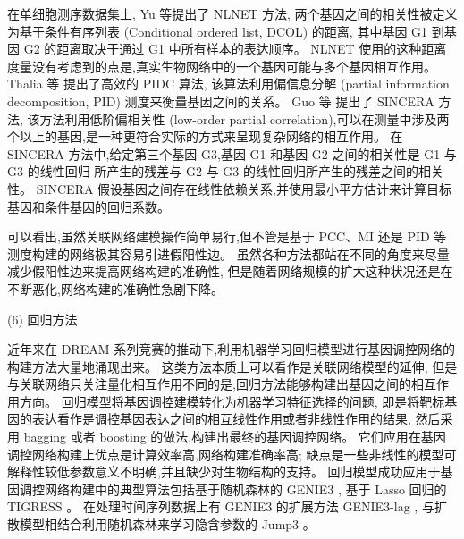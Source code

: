 在单细胞测序数据集上,
Yu 等提出了 NLNET 方法\cite{yu2013hierarchical}, 
两个基因之间的相关性被定义为基于条件有序列表 (Conditional ordered list, DCOL) 的距离,
其中基因 G1 到基因 G2 的距离取决于通过 G1 中所有样本的表达顺序。
NLNET 使用的这种距离度量没有考虑到的点是,真实生物网络中的一个基因可能与多个基因相互作用。
Thalia 等 \cite{chan2017gene} 提出了高效的 PIDC 算法,
该算法利用偏信息分解 (partial information decomposition, PID) 测度来衡量基因之间的关系。
Guo 等 \cite{guo2015sincera} 提出了 SINCERA 方法, 该方法利用低阶偏相关性 (low-order partial correlation),可以在测量中涉及两个以上的基因,是一种更符合实际的方式来呈现复杂网络的相互作用。
在 SINCERA 方法中,给定第三个基因 G3,基因 G1 和基因 G2 之间的相关性是 G1 与 G3 的线性回归
所产生的残差与 G2 与 G3 的线性回归所产生的残差之间的相关性。
SINCERA 假设基因之间存在线性依赖关系,并使用最小平方估计来计算目标基因和条件基因的回归系数。

可以看出,虽然关联网络建模操作简单易行,但不管是基于 PCC、MI 还是 PID 等测度构建的网络极其容易引进假阳性边。
虽然各种方法都站在不同的角度来尽量减少假阳性边来提高网络构建的准确性,
但是随着网络规模的扩大这种状况还是在不断恶化,网络构建的准确性急剧下降。

(6) 回归方法

近年来在 DREAM 系列竞赛的推动下,利用机器学习回归模型进行基因调控网络的构建方法大量地涌现出来。
这类方法本质上可以看作是关联网络模型的延伸,
但是与关联网络只关注量化相互作用不同的是,回归方法能够构建出基因之间的相互作用方向。
回归模型将基因调控建模转化为机器学习特征选择的问题,
即是将靶标基因的表达看作是调控基因表达之间的相互线性作用或者非线性作用的结果,
然后采用 bagging 或者 boosting 的做法,构建出最终的基因调控网络。
它们应用在基因调控网络构建上优点是计算效率高,网络构建准确率高;
缺点是一些非线性的模型可解释性较低参数意义不明确,并且缺少对生物结构的支持。
回归模型成功应用于基因调控网络构建中的典型算法包括基于随机森林的 GENIE3 \cite{Huynh-Thu2010},
基于 Lasso 回归的 TIGRESS \cite{Haury2012}。
在处理时间序列数据上有 GENIE3 的扩展方法 GENIE3-lag \cite{huynh2012machine},
与扩散模型相结合利用随机森林来学习隐含参数的 Jump3 \cite{Huynh-Thu2014}。

